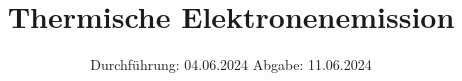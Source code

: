 

\subject{V504}
\title{Thermische Elektronenemission}
\date{%
  Durchführung: 04.06.2024
  \hspace{3em}
  Abgabe: 11.06.2024
}



\maketitle
\thispagestyle{empty}
\tableofcontents
\newpage






\printbibliography{}
\appendix
\setcounter{secnumdepth}{0}

